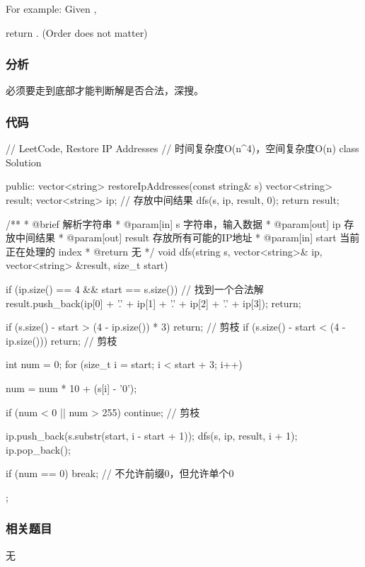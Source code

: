 For example:
Given ,

return \code{["255.255.11.135", "255.255.111.35"]}. (Order does not matter)


\subsubsection{分析}
必须要走到底部才能判断解是否合法，深搜。


\subsubsection{代码}
\begin{Code}
// LeetCode, Restore IP Addresses
// 时间复杂度O(n^4)，空间复杂度O(n)
class Solution {
public:
    vector<string> restoreIpAddresses(const string& s) {
        vector<string> result;
        vector<string> ip; // 存放中间结果
        dfs(s, ip, result, 0);
        return result;
    }

    /**
     * @brief 解析字符串
     * @param[in] s 字符串，输入数据
     * @param[out] ip 存放中间结果
     * @param[out] result 存放所有可能的IP地址
     * @param[in] start 当前正在处理的 index
     * @return 无
     */
    void dfs(string s, vector<string>& ip, vector<string> &result,
            size_t start) {
        if (ip.size() == 4 && start == s.size()) {  // 找到一个合法解
            result.push_back(ip[0] + '.' + ip[1] + '.' + ip[2] + '.' + ip[3]);
            return;
        }

        if (s.size() - start > (4 - ip.size()) * 3)
            return;  // 剪枝
        if (s.size() - start < (4 - ip.size()))
            return;  // 剪枝

        int num = 0;
        for (size_t i = start; i < start + 3; i++) {
            num = num * 10 + (s[i] - '0');

            if (num < 0 || num > 255) continue;  // 剪枝
            
            ip.push_back(s.substr(start, i - start + 1));
            dfs(s, ip, result, i + 1);
            ip.pop_back();
            
            if (num == 0) break;  // 不允许前缀0，但允许单个0
        }
    }
};
\end{Code}


\subsubsection{相关题目}
\begindot
\item 无
\myenddot


